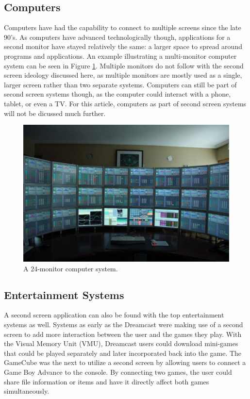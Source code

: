 \documentclass[11pt, oneside]{article}
\begin{document}
\subsection{Computers}
Computers have had the capability to connect to multiple screens since the late 90's. As computers have advanced technologically though, applications for a second monitor have stayed relatively the same: a larger space to spread around programs and applications. An example illustrating a multi-monitor computer system can be seen in Figure \ref{monitors}. Multiple monitors do not follow with the second screen ideology discussed here, as multiple monitors are mostly used as a single, larger screen rather than two separate systems. Computers can still be part of second screen systems though, as the computer could interact with a phone, tablet, or even a TV. For this article, computers as part of second screen systems will not be dicussed much further.

\begin{figure}
    \centering
    \includegraphics[width=.8\textwidth]{Multiple-Monitor-Setup.jpg}
    \caption{A 24-monitor computer system.}
    \label{monitors}
\end{figure}

\subsection{Entertainment Systems}
A second screen application can also be found with the top entertainment systems as well. Systems as early as the Dreamcast were making use of a second screen to add more interaction between the user and the games they play. With the Visual Memory Unit (VMU), Dreamcast users could download mini-games that could be played separately and later incorporated back into the game. The GameCube was the next to utilize a second screen by allowing users to connect a Game Boy Advance to the console. By connecting two games, the user could share file information or items and have it directly affect both games simultaneously. 
\end{document}
